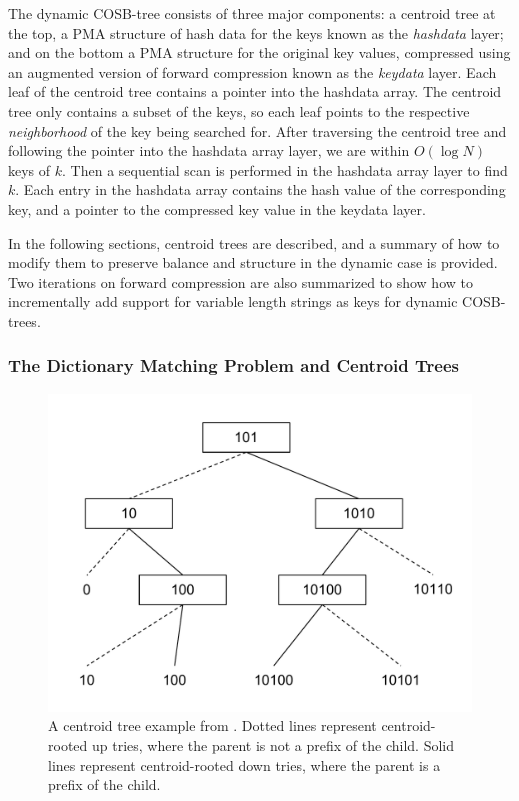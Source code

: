 \documentclass[preprint]{style}
\begin{document}
The dynamic COSB-tree consists of three major components: a centroid tree at
the top, a PMA structure of hash data for the keys known as the \emph{hashdata}
layer; and on the bottom a PMA structure for the original key values,
compressed using an augmented version of forward compression known as the
\emph{keydata} layer. Each leaf of the centroid tree contains a pointer into
the hashdata array. The centroid tree only contains a subset of the keys, so
each leaf points to the respective \emph{neighborhood} of the key being
searched for. After traversing the centroid tree and following the pointer into
the hashdata array layer, we are within $O(\log{}N)$ keys of $k$. Then a
sequential scan is performed in the hashdata array layer to find $k$. Each
entry in the hashdata array contains the hash value of the corresponding key,
and a pointer to the compressed key value in the keydata layer.

In the following sections, centroid trees are described, and a summary of
how to modify them to preserve balance and structure in the dynamic case is
provided. Two iterations on forward compression are also summarized to show
how to incrementally add support for variable length strings as keys for
dynamic COSB-trees.

\subsubsection{The Dictionary Matching Problem and Centroid Trees} %
\begin{figure}

\begin{center}
	\includegraphics[width=0.8\columnwidth]{figures/centroidtreeexample.pdf}
\end{center}

\caption{A centroid tree example from \cite{BenderFaKu06}. Dotted lines represent centroid-rooted up tries, where the parent is not a prefix of the child. Solid lines represent centroid-rooted down tries, where the parent is a prefix of the child.}
\label{fig:centroid}
\end{figure}
\end{document}
